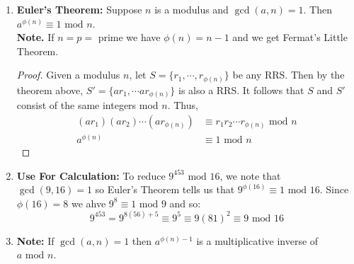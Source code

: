 \documentclass[class=article, crop=false]{standalone}
\begin{document}
\begin{enumerate}[1.]
\begin{enumerate}[(a)]
\begin{proof}
\begin{itemize}
			\item Suppose we have $ar_i\equiv ar_j\mbox{ mod }n$, since $\gcd(a,n)=1$ we can cancel.
			So $r_i \equiv r_j \mbox{ mod }n$. So no two new elements are congruent mod $n$.
			\end{itemize}
		\end{proof}
	\end{enumerate}

	\item \textbf{Euler's Theorem:} Suppose $n$ is a modulus and $\gcd(a,n)=1$. Then
	$a^{\phi(n)}\equiv 1\mbox{ mod }n$.\\
	\textbf{Note.} If $n=p=$ prime we have $\phi(n)=n-1$ and we get Fermat's Little Theorem.
	\begin{proof}
		Given a modulus $n$, let $S = \{r_1, \cdots, r_{\phi(n)}\}$ be any RRS.
		Then by the theorem above, $S'=\{ar_1, \cdots ar_{\phi(n)}\}$ is also a RRS.
		It follows that $S$ and $S'$ consist of the same integers mod $n$. Thus,
		\begin{align*}
			(ar_1)(ar_2)\cdots (ar_{\phi(n)}) &\equiv r_1 r_2\cdots r_{\phi(n)} \mbox{ mod }n \\
			a^{\phi(n)} &\equiv 1\mbox{ mod }n
		\end{align*}
	\end{proof}

	\item \textbf{Use For Calculation:}
	To reduce $9^{453} \mbox{ mod }16$, we note that $\gcd(9,16)=1$ so Euler's Theorem tells us that
	$9^{\phi(16)}\equiv 1\mbox{ mod }16$. Since $\phi(16)=8$ we ahve $9^8 \equiv 1 \mbox{ mod }9$ and so:
	$$9^{453} = 9^{8(56)+5} \equiv 9^5 \equiv 9(81)^2 \equiv 9\mbox{ mod }16$$

	\item \textbf{Note:} If $\gcd(a,n)=1$ then $a^{\phi(n)-1}$ is a multiplicative inverse of $a\mbox{ mod }n$. 
\end{enumerate}

\end{document}
